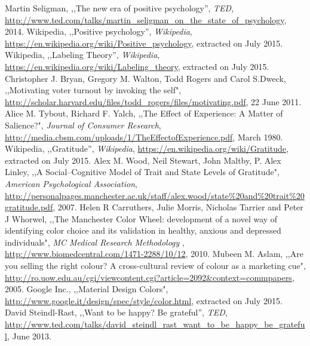 \documentclass[times]{jtitauth}
\begin{document}
\begin{thebibliography}{99}
Martin Seligman, ,,The new era of positive psychology'', {\it TED}, \url{http://www.ted.com/talks/martin_seligman_on_the_state_of_psychology}, 2014.
Wikipedia, ,,Positive psychology'', {\it Wikipedia}, \url{https://en.wikipedia.org/wiki/Positive_psychology}, extracted on July 2015.
Wikipedia, ,,Labeling Theory'', {\it Wikipedia}, \url{https://en.wikipedia.org/wiki/Labeling_theory}, extracted on July 2015.
Christopher J. Bryan, Gregory M. Walton, Todd Rogers and Carol S.Dweck, ,,Motivating voter turnout by invoking the self", \url{http://scholar.harvard.edu/files/todd_rogers/files/motivating.pdf}, 22 June 2011.
Alice M. Tybout, Richard F. Yalch,  ,,The Effect of Experience: A Matter of
Salience?", {\it Journal of Consumer Research}, \url{http://media.cbsm.com/uploads/1/TheEffectofExperience.pdf}, March 1980.
Wikipedia, ,,Gratitude'', {\it Wikipedia}, \url{https://en.wikipedia.org/wiki/Gratitude}, extracted on July 2015.
Alex M. Wood, Neil Stewart, John Maltby, P. Alex Linley,  ,,A Social–Cognitive Model of Trait and State Levels of Gratitude", {\it American Psychological Association}, \url{http://personalpages.manchester.ac.uk/staff/alex.wood/state\%20and\%20trait\%20gratitude.pdf}, 2007.
Helen R Carruthers, Julie Morris, Nicholas Tarrier and Peter J Whorwel, ,,The Manchester Color Wheel: development of a novel way of identifying color choice and its validation in healthy, anxious and depressed individuals", {\it MC Medical Research Methodology }, \url{http://www.biomedcentral.com/1471-2288/10/12}, 2010.
Mubeen M. Aslam, ,,Are you selling the right colour? A cross-cultural review of colour as a marketing cue", \url{http://ro.uow.edu.au/cgi/viewcontent.cgi?article=2092&context=commpapers}, 2005.
Google Inc., ,,Material Design Colors", \url{http://www.google.it/design/spec/style/color.html}, extracted on July 2015.
David Steindl-Rast, ,,Want to be happy? Be grateful'', {\it TED}, \url{http://www.ted.com/talks/david_steindl_rast_want_to_be_happy_be_grateful}, June 2013.
\end{thebibliography}
\end{document}
